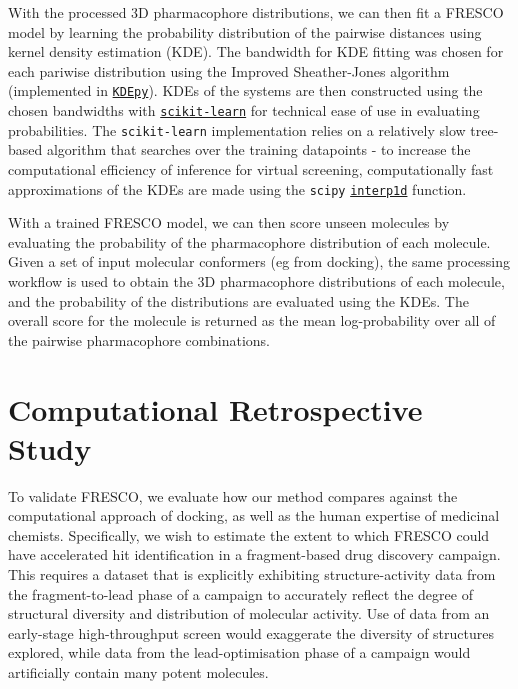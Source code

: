 With the processed 3D pharmacophore distributions, we can then fit a FRESCO model by learning the probability distribution of the pairwise distances using kernel density estimation (KDE). The bandwidth for KDE fitting was chosen for each pariwise distribution using the Improved Sheather-Jones algorithm \cite{Botev2010ISJ} (implemented in \href{https://kdepy.readthedocs.io/en/latest/index.html}{\texttt{KDEpy}}). KDEs of the systems are then constructed using the chosen bandwidths with \href{https://scikit-learn.org/stable/}{\texttt{scikit-learn}} for technical ease of use in evaluating probabilities. The \texttt{scikit-learn} implementation relies on a relatively slow tree-based algorithm that searches over the training datapoints - to increase the computational efficiency of inference for virtual screening, computationally fast approximations of the KDEs are made using the \texttt{scipy} \href{https://docs.scipy.org/doc/scipy/reference/generated/scipy.interpolate.interp1d.html#scipy.interpolate.interp1d}{\texttt{interp1d}} function.

With a trained FRESCO model, we can then score unseen molecules by evaluating the probability of the pharmacophore distribution of each molecule. Given a set of input molecular conformers (eg from docking), the same processing workflow is used to obtain the 3D pharmacophore distributions of each molecule, and the probability of the distributions are evaluated using the KDEs. The overall score for the molecule is returned as the mean log-probability over all of the pairwise pharmacophore combinations.

\section{Computational Retrospective Study} \label{sec:retrospective}

To validate FRESCO, we evaluate how our method compares against the computational approach of docking, as well as the human expertise of medicinal chemists. Specifically, we wish to estimate the extent to which FRESCO could have accelerated hit identification in a fragment-based drug discovery campaign. This requires a dataset that is explicitly exhibiting structure-activity data from the fragment-to-lead phase of a campaign to accurately reflect the degree of structural diversity and distribution of molecular activity. Use of data from an early-stage high-throughput screen would exaggerate the diversity of structures explored, while data from the lead-optimisation phase of a campaign would artificially contain many potent molecules.

